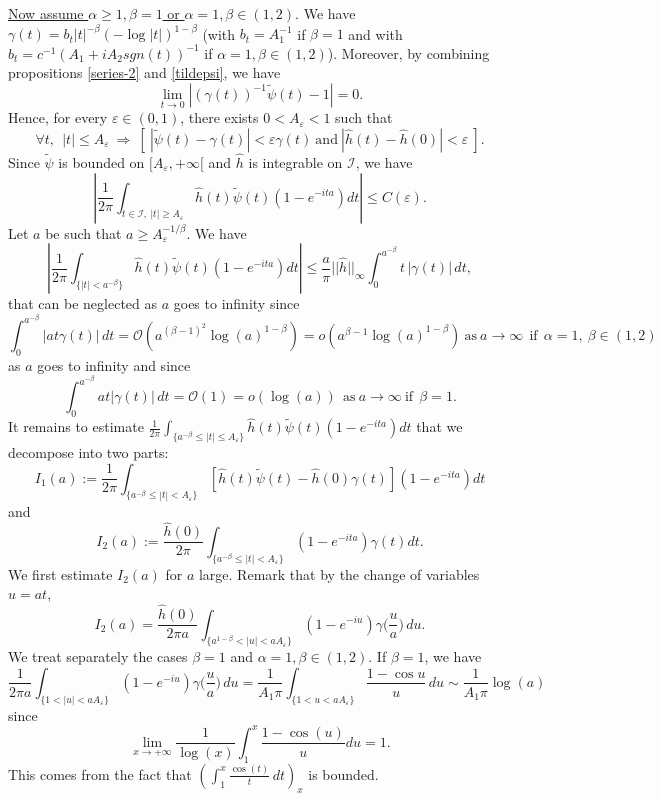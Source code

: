 \documentclass[oneside, a4paper,11pt,reqno]{amsart}
\begin{document}
\underline{Now assume $\alpha\ge 1,\beta=1$ or $\alpha=1,\beta\in(1,2)$}. 
We have $\gamma(t)= b_t |t|^{-\beta}(-\log |t|)^{1-\beta}$
(with $b_t=A_1^{-1}$ if $\beta=1$ and with $b_t=c^{-1}(A_1+iA_2 sgn(t))^{-1}$ if $\alpha=1,\beta\in(1,2)$).
Moreover, by combining propositions \ref{series-2} and  \ref{tildepsi}, we have
$$ \lim_{t\rightarrow 0} \left| (\gamma(t))^{-1}  \tilde\psi(t) - 1\right| =0.$$ 
Hence, for every $\varepsilon\in (0,1)$, there exists $0<A_{\varepsilon}<1$ such that
\begin{equation}\label{estim}
\forall t,\ \ |t|\leq A_{\varepsilon}\ \Rightarrow\ [\ |\tilde\psi(t) -\gamma(t)|
   <\varepsilon\gamma(t)\ \mbox{and}\ |\hat{h}(t)-\hat{h}(0)|<\varepsilon\ ].
\end{equation}
Since  $\tilde\psi$ is bounded on $[A_{\varepsilon},+\infty[$ and $\hat{h}$ is integrable
on $\mathcal I$, we have
$$\left|\frac{1}{2\pi} \int_{t\in\mathcal I,\ |t|\geq A_{\varepsilon}} 
   \hat{h}(t) \tilde\psi(t) (1-e^{-ita})dt\right|\leq C(\varepsilon).$$
Let $a$ be such that $a\ge A_\varepsilon^{-1/\beta}$. We have
$$\left|\frac{1}{2\pi} \int_{\{|t| < a^{-\beta}\}} 
   \hat{h}(t) \tilde\psi(t) (1-e^{-ita})dt\right|\leq \frac{a}{\pi} || \hat{h}||_{\infty} 
\int_0^{a^{-\beta}} t\, |\gamma(t)|\, dt,$$
that can be neglected as $a$ goes to infinity since
$$\int_0^{a^{-\beta}} |at\gamma(t)|\, dt=\mathcal{O}\left( a^{(\beta-1)^2} 
         \log(a)^{1-\beta}\right)=o(  a^{\beta-1}  \log (a)^{1-\beta} )\ 
\mbox{as}\ a\rightarrow \infty\ 
        \ \mbox{if}\ \ \alpha=1,\  \beta\in (1,2)$$
as $a$ goes to infinity
and since
$$ \int_0^{a^{-\beta}} a t |\gamma(t)|\, dt=\mathcal{O}(1) = o(\log(a))\ \ 
\mbox{as}\ a\rightarrow \infty\ \mbox{if}\ \ \beta=1.$$
It remains to estimate  $\frac{1}{2\pi} 
\int_{\{a^{-\beta}\leq |t|\leq A_{\varepsilon}\}} \hat{h}(t) \tilde\psi(t) (1-e^{-ita})dt$ that we decompose into two parts:
\begin{equation*}
I_1(a):= \frac{1}{2\pi} \int_{\{a^{-\beta}\leq |t| < A_{\varepsilon}\} } 
[ \hat{h}(t) \tilde\psi(t) - \hat{h}(0)\gamma(t)]  (1-e^{-ita})  dt 
\end{equation*} 
and 
$$I_2(a):=  \frac{\hat{h}(0)}{2\pi} \int_{\{a^{-\beta}\leq |t| < A_{\varepsilon}\} }  (1-e^{-ita}) \gamma(t)  dt.  $$ 
\textbullet We first estimate $I_2(a)$ for $a$ large. Remark that  by the change of variables $u= at$,
$$I_2(a)=  \frac{\hat{h}(0) }{2\pi a} \int_{\{a^{1-\beta}<|u|<a A_{\varepsilon}\}}
  (1-e^{-iu})\gamma\Big(\frac{u}{a}\Big)\, du.  $$ 
We treat separately the cases $\beta=1$ and $\alpha=1,\beta\in (1,2)$. 
If $\beta=1$, we have
$$ \frac 1{2\pi a}\int_{\{ 1 <|u|< a A_{\varepsilon}\}}
  (1-e^{-iu})\gamma\Big(\frac{u}{a}\Big)\, du= \frac{1}{A_1 \pi}\int_{\{1<u< a A_{\varepsilon}\}}
  \frac{1-\cos u}{u}\, du\sim \frac 1{A_1 \pi}\log (a) $$
since
$$\lim_{x\rightarrow +\infty} \frac{1}{\log (x)} \int_{1}^{x} \frac{1-\cos(u)}{u} du=1.$$
This comes from the fact that $\left(\int_1^x\frac{\cos(t)}t\, dt\right)_x$
is bounded.
\end{document}
